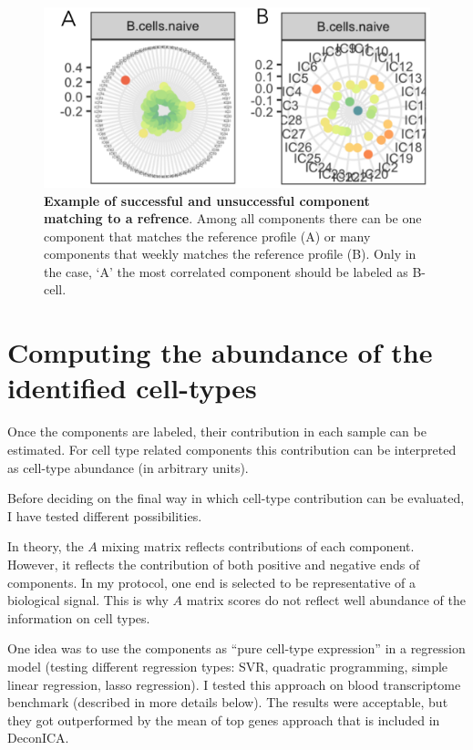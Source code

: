 \documentclass[12pt,]{book}
\theoremstyle{definition}
\theoremstyle{definition}
\theoremstyle{definition}
\theoremstyle{remark}
\begin{document}
\begin{figure}

{\centering \includegraphics[width=0.7\linewidth]{figures-ext/corrEx} 

}

\caption[Example of sucesfull and unsucessful component matching to refrence]{\textbf{Example of successful and unsuccessful
component matching to a refrence}. Among all components there can be one
component that matches the reference profile (A) or many components that
weekly matches the reference profile (B). Only in the case, `A' the most
correlated component should be labeled as B-cell.}\label{fig:corrEx}
\end{figure}







\hypertarget{computing-the-abundance-of-the-identified-cell-types}{%
\section{Computing the abundance of the identified
cell-types}\label{computing-the-abundance-of-the-identified-cell-types}}

Once the components are labeled, their contribution in each sample can
be estimated. For cell type related components this contribution can be
interpreted as cell-type abundance (in arbitrary units).

Before deciding on the final way in which cell-type contribution can be
evaluated, I have tested different possibilities.

In theory, the \(A\) mixing matrix reflects contributions of each
component. However, it reflects the contribution of both positive and
negative ends of components. In my protocol, one end is selected to be
representative of a biological signal. This is why \(A\) matrix scores
do not reflect well abundance of the information on cell types.

One idea was to use the components as ``pure cell-type expression'' in a
regression model (testing different regression types: SVR, quadratic
programming, simple linear regression, lasso regression). I tested this
approach on blood transcriptome benchmark (described in more details
below). The results were acceptable, but they got outperformed by the
mean of top genes approach that is included in DeconICA.
\end{document}
